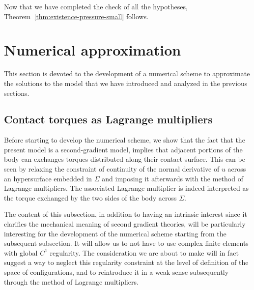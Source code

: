 \documentclass[a4paper,10pt,oneside]{amsbook}
\numberwithin{section}{chapter}
\numberwithin{equation}{chapter}
\theoremstyle{definition}
\begin{document}
Now that we have completed the check of all the hypotheses, Theorem~\ref{thm:existence-pressure-small} follows.

\section{Numerical approximation}

This section is devoted to the development of a numerical scheme to approximate the solutions to the model that we have introduced and analyzed in the previous sections.

\subsection{Contact torques as Lagrange multipliers}
\label{subsec:torques}

Before starting to develop the numerical scheme, we show that the fact that the present model is a second-gradient model, implies that adjacent portions of the body can exchanges torques distributed along their contact surface. This can be seen by relaxing the constraint of continuity of the normal derivative of $u$ across an hypersurface embedded in $\Sigma$ and imposing it afterwards with the method of Lagrange multipliers. The associated Lagrange multiplier is indeed interpreted as the torque exchanged by the two sides of the body across $\Sigma$.

The content of this subsection, in addition to having an intrinsic interest since it clarifies the mechanical meaning of second gradient theories, will be particularly interesting for the development of the numerical scheme starting from the subsequent subsection. It will allow us to not have to use complex finite elements with global $C^1$ regularity. The consideration we are about to make will in fact suggest a way to neglect this regularity constraint at the level of definition of the space of configurations, and to reintroduce it in a weak sense subsequently through the method of Lagrange multipliers.
\end{document}
